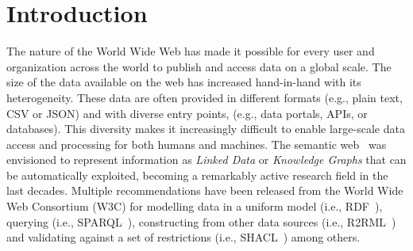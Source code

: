 \chapter{Introduction}
\label{chapter:intro}





The nature of the World Wide Web has made it possible for every user and organization across the world to publish and access data on a global scale. 
The size of the data available on the web has increased hand-in-hand with its heterogeneity. 
These data are often provided in different formats (e.g., plain text, CSV or JSON) and with diverse entry points, (e.g., data portals, APIs, or databases). 
This diversity makes it increasingly difficult to enable large-scale data access and processing for both humans and machines.
The semantic web~\parencite{berners2001semantic} was envisioned to represent information as \textit{Linked Data} or \textit{Knowledge Graphs} that can be automatically exploited, becoming a remarkably active research field in the last decades.
Multiple recommendations have been released from the World Wide Web Consortium (W3C) for modelling data in a uniform model (i.e., RDF~\parencite{rdf}), querying (i.e., SPARQL~\parencite{harris2013sparql}), constructing from other data sources (i.e., R2RML~\parencite{das2012r2rml}) and validating against a set of restrictions (i.e., SHACL~\parencite{SHACL}) among others. 

